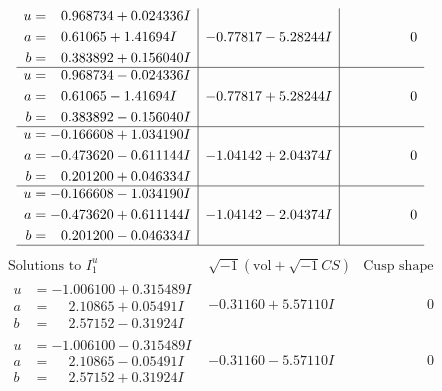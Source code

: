 \documentclass[1p]{elsarticle_modified}
\theoremstyle{definition}
\newcommand{\I}{\sqrt{-1}}
\begin{document}
$$\begin{array}{c|c|c}
\begin{aligned}
u &= \phantom{-}0.968734 + 0.024336 I \\
a &= \phantom{-}0.61065 + 1.41694 I \\
b &= \phantom{-}0.383892 + 0.156040 I\end{aligned}
 & -0.77817 - 5.28244 I & \phantom{-0.000000 } 0 \\ \hline\begin{aligned}
u &= \phantom{-}0.968734 - 0.024336 I \\
a &= \phantom{-}0.61065 - 1.41694 I \\
b &= \phantom{-}0.383892 - 0.156040 I\end{aligned}
 & -0.77817 + 5.28244 I & \phantom{-0.000000 } 0 \\ \hline\begin{aligned}
u &= -0.166608 + 1.034190 I \\
a &= -0.473620 - 0.611144 I \\
b &= \phantom{-}0.201200 + 0.046334 I\end{aligned}
 & -1.04142 + 2.04374 I & \phantom{-0.000000 } 0 \\ \hline\begin{aligned}
u &= -0.166608 - 1.034190 I \\
a &= -0.473620 + 0.611144 I \\
b &= \phantom{-}0.201200 - 0.046334 I\end{aligned}
 & -1.04142 - 2.04374 I & \phantom{-0.000000 } 0\\
 \hline 
 \end{array}$$\newpage$$\begin{array}{c|c|c}  
\text{Solutions to }I^u_{1}& \I (\text{vol} + \sqrt{-1}CS) & \text{Cusp shape}\\
 \hline 
\begin{aligned}
u &= -1.006100 + 0.315489 I \\
a &= \phantom{-}2.10865 + 0.05491 I \\
b &= \phantom{-}2.57152 - 0.31924 I\end{aligned}
 & -0.31160 + 5.57110 I & \phantom{-0.000000 } 0 \\ \hline\begin{aligned}
u &= -1.006100 - 0.315489 I \\
a &= \phantom{-}2.10865 - 0.05491 I \\
b &= \phantom{-}2.57152 + 0.31924 I\end{aligned}
 & -0.31160 - 5.57110 I & \phantom{-0.000000 } 0 \\ \hline\begin{aligned}

\end{aligned}
\end{array}$$
\end{document}
